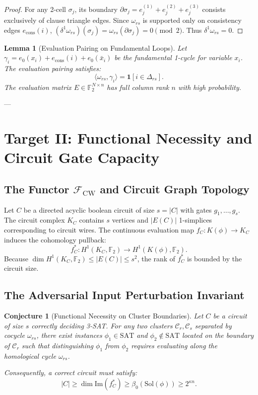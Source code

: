 \documentclass[11pt,a4paper]{article}
\theoremstyle{plain}
\newtheorem{lemma}[theorem]{Lemma}
\newtheorem{conjecture}[theorem]{Conjecture}
\theoremstyle{definition}
\theoremstyle{remark}
\newcommand{\Img}{\mathrm{Im}}
\begin{document}
\begin{proof}
For any 2-cell $\sigma_j$, its boundary $\partial \sigma_j = e_j^{(1)} + e_j^{(2)} + e_j^{(3)}$ consists exclusively of clause triangle edges. Since $\omega_{rs}$ is supported only on consistency edges $e_{\mathrm{cons}}(i)$, $(\delta^1 \omega_{rs})(\sigma_j) = \omega_{rs}(\partial \sigma_j) = 0 \pmod 2$. Thus $\delta^1 \omega_{rs} = 0$.
\end{proof}

\begin{lemma}[Evaluation Pairing on Fundamental Loops]
Let $\gamma_i = e_0(x_i) + e_{\mathrm{cons}}(i) + e_0(\bar{x}_i)$ be the fundamental 1-cycle for variable $x_i$. The evaluation pairing satisfies:
\[
\langle \omega_{rs}, \gamma_i \rangle = \mathbf{1}[i \in \Delta_{rs}].
\]
The evaluation matrix $E \in \mathbb{F}_2^{N \times n}$ has full column rank $n$ with high probability.
\end{lemma}

---

\section{Target II: Functional Necessity and Circuit Gate Capacity}

\subsection{The Functor $\mathcal{F}_{\mathrm{CW}}$ and Circuit Graph Topology}

Let $C$ be a directed acyclic boolean circuit of size $s = |C|$ with gates $g_1, \dots, g_s$. The circuit complex $K_C$ contains $s$ vertices and $|E(C)|$ 1-simplices corresponding to circuit wires. The continuous evaluation map $f_C: K(\phi) \to K_C$ induces the cohomology pullback:
\[
f_C^*: H^1(K_C, \mathbb{F}_2) \longrightarrow H^1(K(\phi), \mathbb{F}_2).
\]
Because $\dim H^1(K_C, \mathbb{F}_2) \le |E(C)| \le s^2$, the rank of $f_C^*$ is bounded by the circuit size.

\subsection{The Adversarial Input Perturbation Invariant}

\begin{conjecture}[Functional Necessity on Cluster Boundaries]\label{conj:functional_necessity}
Let $C$ be a circuit of size $s$ correctly deciding 3-SAT. For any two clusters $\mathcal{C}_r, \mathcal{C}_s$ separated by cocycle $\omega_{rs}$, there exist instances $\phi_1 \in \mathrm{SAT}$ and $\phi_2 \notin \mathrm{SAT}$ located on the boundary of $\mathcal{C}_r$ such that distinguishing $\phi_1$ from $\phi_2$ requires evaluating along the homological cycle $\omega_{rs}$.

Consequently, a correct circuit must satisfy:
\[
|C| \ge \dim \Img(f_C^*) \ge \beta_0(\mathrm{Sol}(\phi)) \ge 2^{\kappa n}.
\]
\end{conjecture}
\end{document}
